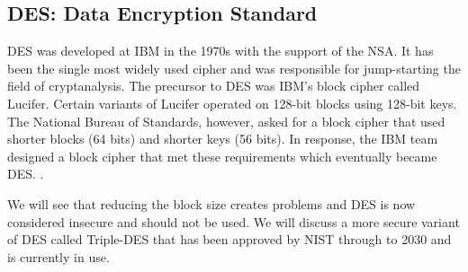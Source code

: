 \subsection{DES: Data Encryption Standard}
\par DES was developed at IBM in the 1970s with the support of the NSA. It has been the single most widely used cipher and was responsible for jump-starting the field of cryptanalysis. The precursor to DES was IBM's block cipher called Lucifer. Certain variants of Lucifer
operated on 128-bit blocks using 128-bit keys. The National Bureau of Standards, however, asked for a block cipher that used shorter blocks 
(64 bits) and shorter keys (56 bits). In response, the IBM team designed a block cipher that met these requirements which eventually became 
DES. \cite{BonehShoupBook}.

\par We will see that reducing the block size creates problems and DES is now considered insecure and should not be used. We will discuss a more secure variant of DES called Triple-DES that has been approved by NIST through to 2030 and is currently in use\cite{BonehShoupBook}. 

\newpage

